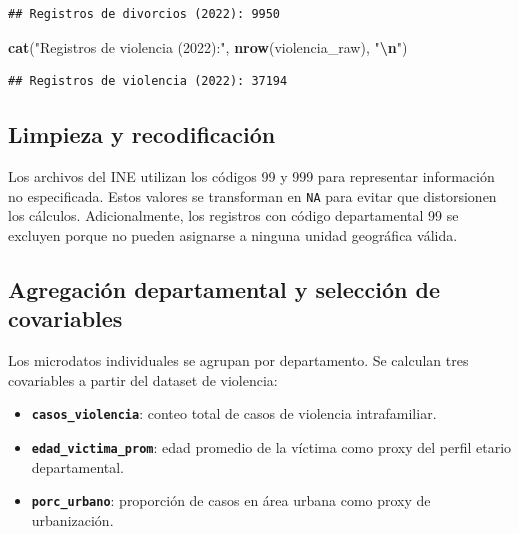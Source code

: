\documentclass[
]{article}
\newenvironment{Shaded}{\begin{snugshade}}{\end{snugshade}}
\newcommand{\FunctionTok}[1]{\textcolor[rgb]{0.13,0.29,0.53}{\textbf{#1}}}
\newcommand{\NormalTok}[1]{#1}
\newcommand{\SpecialCharTok}[1]{\textcolor[rgb]{0.81,0.36,0.00}{\textbf{#1}}}
\newcommand{\StringTok}[1]{\textcolor[rgb]{0.31,0.60,0.02}{#1}}
\providecommand{\tightlist}{%
  \setlength{\itemsep}{0pt}\setlength{\parskip}{0pt}}
\begin{document}
\begin{verbatim}
## Registros de divorcios (2022): 9950
\end{verbatim}

\begin{Shaded}
\begin{Highlighting}[]
\FunctionTok{cat}\NormalTok{(}\StringTok{"Registros de violencia (2022):"}\NormalTok{, }\FunctionTok{nrow}\NormalTok{(violencia\_raw), }\StringTok{"}\SpecialCharTok{\textbackslash{}n}\StringTok{"}\NormalTok{)}
\end{Highlighting}
\end{Shaded}

\begin{verbatim}
## Registros de violencia (2022): 37194
\end{verbatim}

\hypertarget{limpieza-y-recodificaciuxf3n}{%
\subsection{Limpieza y
recodificación}\label{limpieza-y-recodificaciuxf3n}}

Los archivos del INE utilizan los códigos 99 y 999 para representar
información no especificada. Estos valores se transforman en \texttt{NA}
para evitar que distorsionen los cálculos. Adicionalmente, los registros
con código departamental 99 se excluyen porque no pueden asignarse a
ninguna unidad geográfica válida.

\hypertarget{agregaciuxf3n-departamental-y-selecciuxf3n-de-covariables}{%
\subsection{Agregación departamental y selección de
covariables}\label{agregaciuxf3n-departamental-y-selecciuxf3n-de-covariables}}

Los microdatos individuales se agrupan por departamento. Se calculan
tres covariables a partir del dataset de violencia:

\begin{itemize}
\tightlist
\item
  \textbf{\texttt{casos\_violencia}}: conteo total de casos de violencia
  intrafamiliar.
\item
  \textbf{\texttt{edad\_victima\_prom}}: edad promedio de la víctima
  como proxy del perfil etario departamental.
\item
  \textbf{\texttt{porc\_urbano}}: proporción de casos en área urbana
  como proxy de urbanización.
\end{itemize}
\end{document}
